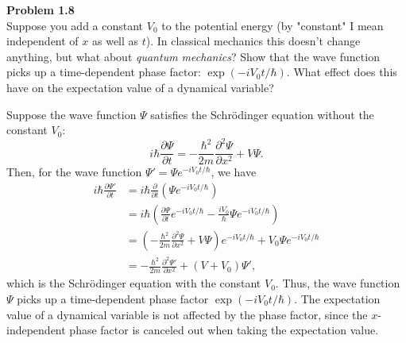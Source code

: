 \documentclass[en, oneside]{vivi}
\begin{document}
\begin{prob} \textbf{Problem 1.8}\\
    Suppose you add a constant $V_0$ to the potential energy (by "constant" I mean independent of $x$ as well as $t$). In classical mechanics this doesn't change anything, but what about \textit{quantum mechanics}? Show that the wave function picks up a time-dependent phase factor: $\exp(-i V_0 t / \hbar)$. What effect does this have on the expectation value of a dynamical variable?
\end{prob}

\begin{sol}
    Suppose the wave function $\Psi$ satisfies the Schrödinger equation without the constant $V_0$:
    \begin{equation}
        i \hbar \frac{\partial \Psi}{\partial t} = -\frac{\hbar^2}{2m} \frac{\partial^2 \Psi}{\partial x^2} + V \Psi.
    \end{equation}
    Then, for the wave function $\Psi' = \Psi e^{-i V_0 t / \hbar}$, we have
    \begin{align}
        i \hbar \frac{\partial \Psi'}{\partial t} &= i \hbar \frac{\partial}{\partial t} (\Psi e^{-i V_0 t / \hbar})\\
        &= i \hbar \left( \frac{\partial \Psi}{\partial t} e^{-i V_0 t / \hbar} - \frac{i V_0}{\hbar} \Psi e^{-i V_0 t / \hbar} \right)\\
        &= \left(-\frac{\hbar^2}{2m} \frac{\partial^2 \Psi}{\partial x^2} + V \Psi \right) e^{-i V_0 t / \hbar} + V_0 \Psi e^{-i V_0 t / \hbar}\\
        &= -\frac{\hbar^2}{2m} \frac{\partial^2 \Psi'}{\partial x^2} + (V + V_0) \Psi',
    \end{align}
    which is the Schrödinger equation with the constant $V_0$. 
    Thus, the wave function $\Psi$ picks up a time-dependent phase factor $\exp(-i V_0 t / \hbar)$.
    The expectation value of a dynamical variable is not affected by the phase factor, since the $x$-independent phase factor is canceled out when taking the expectation value.
\end{sol}
\end{document}
